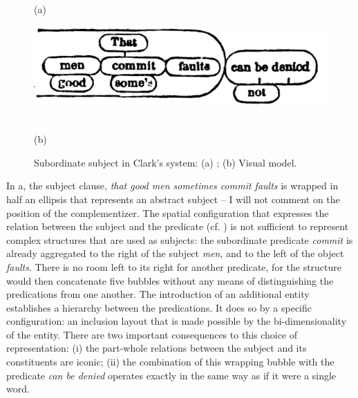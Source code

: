 \documentclass[english,output=paper,colorlinks,citecolor=brown]{../langscibook}
\begin{document}
\begin{figure}
     (a) \hspace{1em} \begin{minipage}[c]{.45\textwidth}\includegraphics[width=\textwidth]{figures/04/Clark3.png}\end{minipage}\medskip\\
     (b) \hspace{1em} 
    \caption{Subordinate subject in Clark’s system: (a) \citeyear[47]{Clark1870}; (b) Visual model.\label{fig:4:9}}
\end{figure}
 

In a, the subject clause, \textit{that good men sometimes commit faults} is wrapped in half an ellipsis that represents an abstract subject – I will not comment on the position of the complementizer. The spatial configuration that expresses the relation between the subject and the predicate (cf. ) is not sufficient to represent complex structures that are used as subjects: the subordinate predicate \textit{commit} is already aggregated to the right of the subject \textit{men}, and to the left of the object \textit{faults}. There is no room left to its right for another predicate, for the structure would then concatenate five bubbles without any means of distinguishing the predications from one another. The introduction of an additional entity establishes a hierarchy between the predications. It does so by a specific configuration: an inclusion layout that is made possible by the bi-dimensionality of the entity. There are two important consequences to this choice of representation: (i) the part-whole relations between the subject and its constituents are iconic; (ii) the combination of this wrapping bubble with the predicate \textit{can be denied} operates exactly in the same way as if it were a single word.
\end{document}
